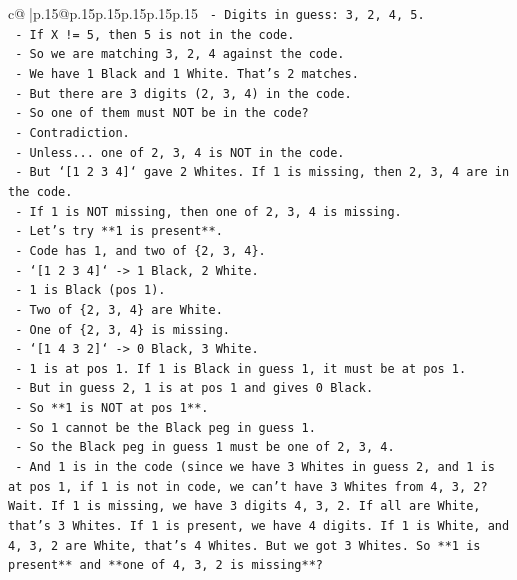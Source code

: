 \documentclass{article}
\begin{document}
{\begin{supertabular}{c@{$\;$}|p{.15\linewidth}@{}p{.15\linewidth}p{.15\linewidth}p{.15\linewidth}p{.15\linewidth}p{.15\linewidth}}
{{{\texttt{  {-} Digits in guess: 3, 2, 4, 5.} \\
\texttt{  {-} If X != 5, then 5 is not in the code.} \\
\texttt{  {-} So we are matching 3, 2, 4 against the code.} \\
\texttt{  {-} We have 1 Black and 1 White. That's 2 matches.} \\
\texttt{  {-} But there are 3 digits (2, 3, 4) in the code.} \\
\texttt{  {-} So one of them must NOT be in the code?} \\
\texttt{  {-} Contradiction.} \\
\texttt{  {-} Unless... one of 2, 3, 4 is NOT in the code.} \\
\texttt{  {-} But `{[}1 2 3 4{]}` gave 2 Whites. If 1 is missing, then 2, 3, 4 are in the code.} \\
\texttt{  {-} If 1 is NOT missing, then one of 2, 3, 4 is missing.} \\
\texttt{  {-} Let's try **1 is present**.} \\
\texttt{  {-} Code has 1, and two of \{2, 3, 4\}.} \\
\texttt{  {-} `{[}1 2 3 4{]}` {-}> 1 Black, 2 White.} \\
\texttt{    {-} 1 is Black (pos 1).} \\
\texttt{    {-} Two of \{2, 3, 4\} are White.} \\
\texttt{    {-} One of \{2, 3, 4\} is missing.} \\
\texttt{  {-} `{[}1 4 3 2{]}` {-}> 0 Black, 3 White.} \\
\texttt{    {-} 1 is at pos 1. If 1 is Black in guess 1, it must be at pos 1.} \\
\texttt{    {-} But in guess 2, 1 is at pos 1 and gives 0 Black.} \\
\texttt{    {-} So **1 is NOT at pos 1**.} \\
\texttt{    {-} So 1 cannot be the Black peg in guess 1.} \\
\texttt{    {-} So the Black peg in guess 1 must be one of 2, 3, 4.} \\
\texttt{    {-} And 1 is in the code (since we have 3 Whites in guess 2, and 1 is at pos 1, if 1 is not in code, we can't have 3 Whites from 4, 3, 2? Wait. If 1 is missing, we have 3 digits 4, 3, 2. If all are White, that's 3 Whites. If 1 is present, we have 4 digits. If 1 is White, and 4, 3, 2 are White, that's 4 Whites. But we got 3 Whites. So **1 is present** and **one of 4, 3, 2 is missing**?} \\
}}}
\end{supertabular}}
\end{document}

